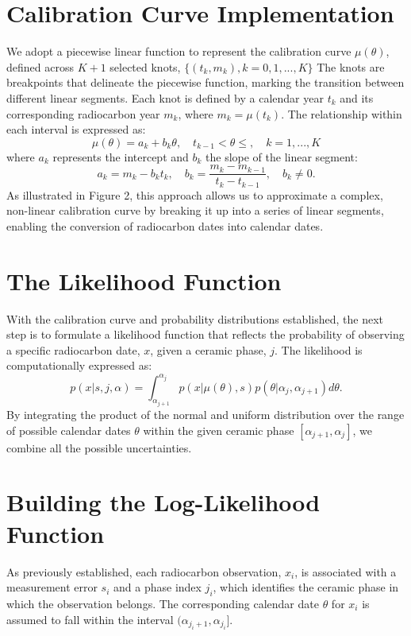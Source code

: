 \documentclass{article}
\begin{document}
\section{Calibration Curve Implementation}
We adopt a piecewise linear function to represent the calibration curve $\mu(\theta)$, defined across $K+1$ selected knots, $ \{(t_k, m_k), k=0,1,...,K\}$
The knots are breakpoints that delineate the piecewise function, marking the transition between different linear segments. Each knot is defined by a calendar year $t_k$ and its corresponding radiocarbon year $m_k$, where $m_k = \mu(t_k)$. The relationship within each interval is expressed as:
\begin{equation*}
    \mu(\theta) = a_k+b_k\theta, \quad t_{k-1}<\theta\leq, \quad k=1,...,K
\end{equation*}
where $a_k$ represents the intercept and $b_k$ the slope of the linear segment:
\begin{equation*}
    a_k = m_k-b_kt_k, \quad b_k = \frac{m_k-m_{k-1}}{t_k-t_{k-1}}, \quad b_k\neq 0.
\end{equation*}
As illustrated in Figure 2, this approach allows us to approximate a complex, non-linear calibration curve by breaking it up into a series of linear segments, enabling the conversion of radiocarbon dates into calendar dates.

\section{The Likelihood Function}
With the calibration curve and probability distributions established, the next step is to formulate a likelihood function that reflects the probability of observing a specific radiocarbon date, $x$, given a ceramic phase, $j$. The likelihood is computationally expressed as:
\begin{equation*}
        p(x|s,j,\alpha) = \int_{\alpha_{j+1}}^{\alpha_j} p(x|\mu(\theta),s)p(\theta|\alpha_j,\alpha_{j+1})d\theta.
\end{equation*}
By integrating the product of the normal and uniform distribution over the range of possible calendar dates $\theta$ within the given ceramic phase $[\alpha_{j+1}, \alpha_j]$, we combine all the possible uncertainties. 


\section{Building the Log-Likelihood Function}
As previously established, each radiocarbon observation, $x_i$, is associated with a measurement error $s_i$ and a phase index $j_i$, which identifies the ceramic phase in which the observation belongs. The corresponding calendar date $\theta$ for $x_i$ is assumed to fall within the interval $(\alpha_{j_i+1}, \alpha_{j_i}]$.
\end{document}

